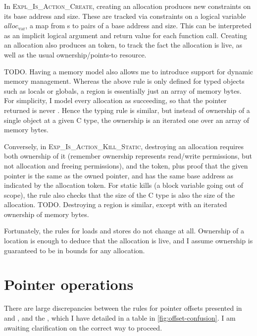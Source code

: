In \textsc{Expl\_Is\_Action\_Create}, creating an allocation produces new
constraints on its base address and size. These are tracked via constraints on a
logical variable $\mathit{alloc}_\mathrm{var}$, a map from s to
pairs of a base address and size. This can be interpreted as an implicit
logical argument and return value for each function call. Creating an
allocation also produces an  token, to track the fact the
allocation is live, as well as the usual ownership/points-to resource.

TODO\@. Having a memory model also allows me to introduce support for dynamic
memory management. Whereas the above rule is only defined for typed objects
such as locals or globals, a region is essentially just an array of memory
bytes. For simplicity, I model every allocation as succeeding, so that the
pointer returned is never . Hence the typing rule is similar,
but instead of ownership of a single object at a given C type, the ownership
is an iterated one over an array of memory bytes.

Conversely, in \textsc{Exp\_Is\_Action\_Kill\_Static}, destroying an allocation
requires both ownership of it (remember ownership represents read/write
permissions, but not allocation and freeing permissions), and the
 token, plus proof that the given pointer is the same as the
owned pointer, and has the same base address as indicated by the allocation
token. For static kills (a block variable going out of scope), the rule also
checks that the size of the C type is also the size of the allocation.
TODO\@. Destroying a region is similar, except with an iterated ownership
of memory bytes.

Fortunately, the rules for loads and stores do not change at all. Ownership of
a location is enough to deduce that the allocation is live, and I assume
ownership is guaranteed to be in bounds for any allocation.

\section{Pointer operations}

There are large discrepancies between the rules for pointer offsets presented
in  and , and
the , which I have detailed in a table in
\cref{fig:offset-confusion}. I am awaiting clarification on the correct way to
proceed.

